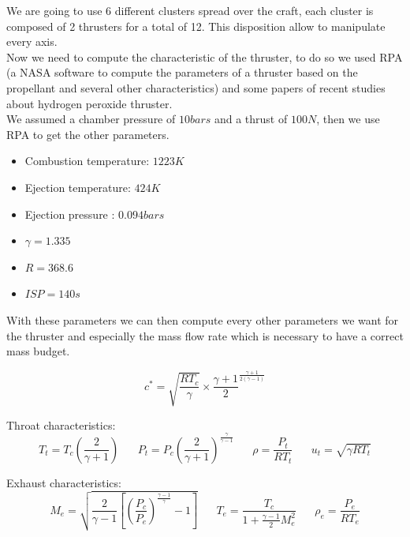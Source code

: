 We are going to use 6 different clusters spread over the craft, each cluster is composed of 2 thrusters for a total of 12. This disposition allow to manipulate every axis. \\

Now we need to compute the characteristic of the thruster, to do so we used RPA (a NASA software to compute the parameters of a thruster based on the propellant and several other characteristics) and some papers of recent studies about hydrogen peroxide thruster. \\

We assumed a chamber pressure of $10bars$ and a thrust of $100N$, then we use RPA to get the other parameters.

\begin{itemize}
    \item Combustion temperature: $1223K$
    \vspace{-0.4cm}
    \item Ejection temperature: $424K$
    \vspace{-0.4cm}
    \item Ejection pressure : $0.094bars$
    \vspace{-0.4cm}
    \item $\gamma = 1.335$
    \vspace{-0.4cm}
    \item $R = 368.6$
    \vspace{-0.4cm}
    \item $ISP = 140s$
\end{itemize}

With these parameters we can then compute every other parameters we want for the thruster and especially the mass flow rate which is necessary to have a correct mass budget. 

$$c^* = \sqrt{\frac{R T_c}{\gamma}}\times \frac{\gamma + 1}{2}^{\frac{\gamma + 1}{2(\gamma - 1)}}$$

Throat characteristics:
$$T_t = T_c \left(\frac{2}{\gamma + 1}\right) \hspace{20pt}
P_t = P_c \left(\frac{2}{\gamma + 1}\right)^{\frac{\gamma}{\gamma - 1}} \hspace{20pt}
\rho = \frac{P_t}{R T_t} \hspace{20pt}   u_t = \sqrt{\gamma R T_t}$$

Exhaust characteristics:
$$M_e = \sqrt{\frac{2}{\gamma - 1}\left[\left(\frac{P_c}{P_e}\right)^\frac{\gamma - 1 }{\gamma} - 1 \right]} \hspace{20pt} T_e = \frac{T_c}{1 + \frac{\gamma - 1}{2}M_e^2}  \hspace{20pt} \rho_e = \frac{P_e}{R T_e}$$

